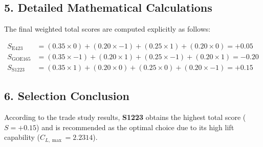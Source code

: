 \documentclass{article}
\begin{document}
\subsection*{5. Detailed Mathematical Calculations}
The final weighted total scores are computed explicitly as follows:

\begin{align}
    S_{\text{E423}}   &= (0.35 \times 0) + (0.20 \times -1) + (0.25 \times 1) + (0.20 \times 0) = \mathbf{+0.05} \\
    S_{\text{GOE165}} &= (0.35 \times -1) + (0.20 \times 1) + (0.25 \times -1) + (0.20 \times 1) = \mathbf{-0.20} \\
    S_{\text{S1223}}  &= (0.35 \times 1) + (0.20 \times 0) + (0.25 \times 0) + (0.20 \times -1) = \mathbf{+0.15}
\end{align}

\subsection*{6. Selection Conclusion}
According to the trade study results, \textbf{S1223} obtains the highest total score ($S = +0.15$) and is recommended as the optimal choice due to its high lift capability ($C_{L,\max} = 2.2314$).
\end{document}
